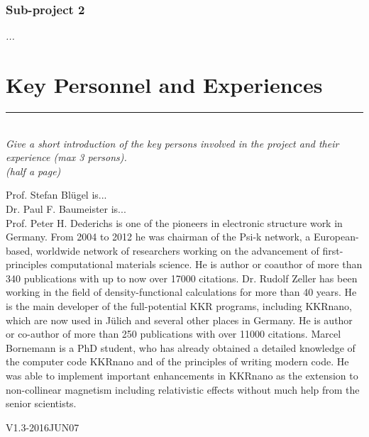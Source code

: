 \documentclass [a4paper, 12pt]{article}
\begin{document}
\subsubsection{Sub-project 2}
\textit{...}\\

\bigskip

\section{Key Personnel and Experiences}
\rule{\textwidth}{0.4pt}\\
\textit{Give a short introduction of the key persons involved in the project and their experience (max 3 persons).}\\

\textit{(half a page)}

Prof. Stefan Bl{\"u}gel is...
\\
Dr. Paul F. Baumeister is...
\\
Prof. Peter H. Dederichs is one of the pioneers in electronic structure work in Germany.
From 2004 to 2012 he was chairman of the Psi-k network, a European-based, worldwide network 
of researchers working on the advancement of first-principles computational materials science.
He is author or coauthor of more than 340 publications with up to now over 17000 citations.
Dr. Rudolf Zeller has been working in the field of density-functional calculations for more than 40 years. 
He is the main developer of the full-potential KKR programs, including KKRnano, 
which are now used in J{\"u}lich and several other places in Germany. He is author or co-author of more 
than 250 publications with over 11000 citations. Marcel Bornemann is a PhD student, who has already
obtained a detailed knowledge of the computer code KKRnano and of the principles of writing modern code. 
He was able to implement important enhancements in KKRnano as the extension to non-collinear
magnetism including relativistic effects without much help from the senior scientists.
\newpage




\bigskip
\begin{flushright}
{\tiny V1.3-2016JUN07}
\end{flushright}
\end{document}
